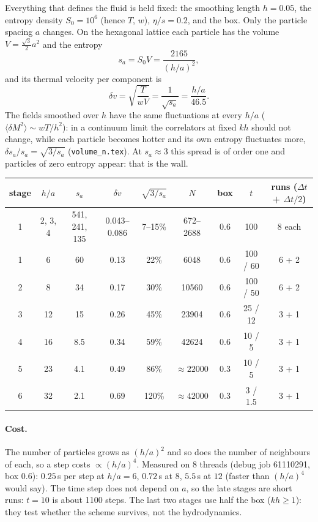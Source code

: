 \documentclass[11pt,aps,preprint,nofootinbib,superscriptaddress,tightenlines]{revtex4-2}
\def\st{\begin{equation}}
\def\stp{\end{equation}}
\newcommand{\avg}[1]{\langle #1\rangle}
\let\oldparagraph\paragraph
\renewcommand{\paragraph}{\par\bigskip\oldparagraph}
\begin{document}
Everything that defines the fluid is held fixed: the smoothing length $h=0.05$, the entropy
density $S_0=10^6$ (hence $T$, $w$), $\eta/s=0.2$, and the box.  Only the particle spacing
$a$ changes.  On the hexagonal lattice each particle has the volume $V=\tfrac{\sqrt3}{2}a^2$
and the entropy
\st
s_a=S_0V=\frac{2165}{(h/a)^2},
\stp
and its thermal velocity per component is
\st
\delta v=\sqrt{\frac{T}{wV}}=\frac{1}{\sqrt{s_a}}=\frac{h/a}{46.5}.
\stp
The fields smoothed over $h$ have the same fluctuations at every $h/a$
($\avg{\delta M^2}\sim wT/h^2$): in a continuum limit the correlators at fixed $kh$ should
not change, while each particle becomes hotter and its own entropy fluctuates more,
$\delta s_a/s_a=\sqrt{3/s_a}$ (\texttt{volume\_n.tex}).  At $s_a\approx3$ this spread is of
order one and particles of zero entropy appear: that is the wall.
\begin{center}
\begin{tabular}{ccccccccc}
\hline
stage & $h/a$ & $s_a$ & $\delta v$ & $\sqrt{3/s_a}$ & $N$ & box & $t$ & runs ($\Delta t$ + $\Delta t/2$) \\ \hline
1 & 2, 3, 4 & 541, 241, 135 & 0.043--0.086 & 7--15\% & 672--2688 & 0.6 & 100 & 8 each \\
1 & 6 & 60 & 0.13 & 22\% & 6048 & 0.6 & 100 / 60 & 6 + 2 \\
2 & 8 & 34 & 0.17 & 30\% & 10560 & 0.6 & 100 / 50 & 6 + 2 \\
3 & 12 & 15 & 0.26 & 45\% & 23904 & 0.6 & 25 / 12 & 3 + 1 \\
4 & 16 & 8.5 & 0.34 & 59\% & 42624 & 0.6 & 10 / 5 & 3 + 1 \\
5 & 23 & 4.1 & 0.49 & 86\% & $\approx22000$ & 0.3 & 10 / 5 & 3 + 1 \\
6 & 32 & 2.1 & 0.69 & 120\% & $\approx42000$ & 0.3 & 3 / 1.5 & 3 + 1 \\
\hline
\end{tabular}
\end{center}

\paragraph{Cost.}  The number of particles grows as $(h/a)^2$ and so does the number of
neighbours of each, so a step costs $\propto(h/a)^4$.  Measured on 8 threads (debug job
61110291, box $0.6$): $0.25$\,s per step at $h/a=6$, $0.72$\,s at $8$, $5.5$\,s at $12$
(faster than $(h/a)^4$ would say).  The time step does not depend on $a$, so the late
stages are short runs: $t=10$ is about 1100 steps.  The last two stages use half the box
($kh\ge1$): they test whether the scheme survives, not the hydrodynamics.
\end{document}
